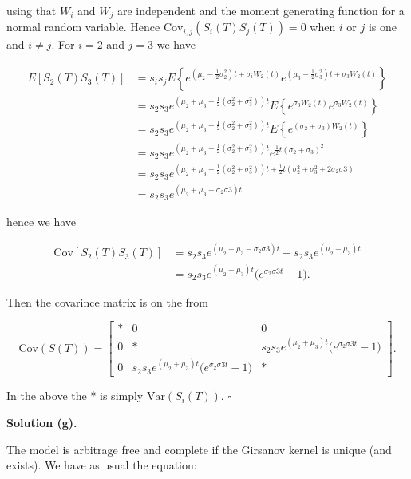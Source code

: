 \documentclass[
]{book}
\begin{document}
using that \(W_i\) and \(W_j\) are independent and the moment generating function for a normal random variable. Hence \(\text{Cov}_{i,j}(S_i(T)S_j(T))=0\) when \(i\) or \(j\) is one and \(i\ne j\). For \(i=2\) and \(j=3\) we have

\begin{align*}
E[S_2(T)S_3(T)]&=s_is_jE\left\{e^{\left(\mu_2-\frac{1}{2}\sigma_2^2\right)t+\sigma_i W_2(t)}e^{\left(\mu_3-\frac{1}{2}\sigma_3^2\right)t+\sigma_3 W_2(t)}\right\}\\
&=s_2s_3e^{\left(\mu_2+\mu_3-\frac{1}{2}(\sigma_2^2+\sigma_3^2)\right)t}E\left\{e^{\sigma_3 W_2(t)}e^{\sigma_3 W_2(t)}\right\}\\
&=s_2s_3e^{\left(\mu_2+\mu_3-\frac{1}{2}(\sigma_2^2+\sigma_3^2)\right)t}E\left\{e^{(\sigma_2 +\sigma_3 )W_2(t)}\right\}\\
&=s_2s_3e^{\left(\mu_2+\mu_3-\frac{1}{2}(\sigma_2^2+\sigma_3^2)\right)t}e^{\frac{1}{2}t(\sigma_2 +\sigma_3 )^2}\\
&=s_2s_3e^{\left(\mu_2+\mu_3-\frac{1}{2}(\sigma_2^2+\sigma_3^2)\right)t+\frac{1}{2}t(\sigma_2^2 +\sigma_3^2+2\sigma_2\sigma3 )}\\
&=s_2s_3e^{\left(\mu_2+\mu_3-\sigma_2\sigma3\right)t}
\end{align*}

hence we have

\begin{align*}
\text{Cov}[S_2(T)S_3(T)]&=s_2s_3e^{\left(\mu_2+\mu_3-\sigma_2\sigma3\right)t}-s_2s_3e^{(\mu_2+\mu_3)t}\\
&=s_2s_3e^{(\mu_2+\mu_3)t}\Big(e^{\sigma_2\sigma3t}-1\Big).
\end{align*}

Then the covarince matrix is on the from

\[
\text{Cov}(S(T))=
\begin{bmatrix}
* & 0 & 0\\
0 & * & s_2s_3e^{(\mu_2+\mu_3)t}\Big(e^{\sigma_2\sigma3t}-1\Big)\\
0 & s_2s_3e^{(\mu_2+\mu_3)t}\Big(e^{\sigma_2\sigma3t}-1\Big) & *
\end{bmatrix}.
\]

In the above the * is simply \(\text{Var}(S_i(T))\). \(\square\)

\noindent\makebox[\linewidth]{\rule{\textwidth}{0.4pt}}

\textbf{Solution (g).}

The model is arbitrage free and complete if the Girsanov kernel is unique (and exists). We have as usual the equation:
\end{document}
